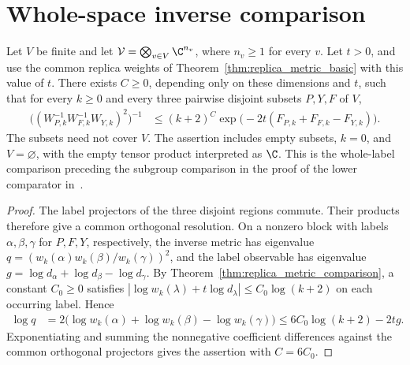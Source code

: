 \section{Whole-space inverse comparison}


\begin{theorem}
    \label{thm:replica_whole_inverse}
    \leanok
    Let $V$ be finite and let
    $\mathcal V=\bigotimes_{v\in V}\C^{n_v}$, where $n_v\ge1$ for every $v$.
    Let $t>0$, and use the common replica weights of
    Theorem~\ref{thm:replica_metric_basic} with this value of $t$.
    There exists $C\ge0$, depending only on these dimensions and $t$, such that
    for every $k\ge0$ and every three pairwise disjoint subsets $P,Y,F$ of $V$,
    \begin{align}
        \bigl((W_{P,k}^{-1}W_{F,k}^{-1}W_{Y,k})^2\bigr)^{-1}
         & \le (k+2)^C
        \exp\bigl(-2t(F_{P,k}+F_{F,k}-F_{Y,k})\bigr).
    \end{align}
    The subsets need not cover $V$. The assertion includes empty subsets,
    $k=0$, and $V=\varnothing$, with the empty tensor product interpreted as $\C$.
    This is the whole-label comparison preceding the subgroup comparison
    in the proof of the lower comparator in~\cite[Section~7]{OpenAI2026AreaLaw}.
\end{theorem}

\begin{proof}\leanok
    The label projectors of the three disjoint regions commute. Their products
    therefore give a common orthogonal resolution. On a nonzero block with
    labels $\alpha,\beta,\gamma$ for $P,F,Y$, respectively, the inverse metric
    has eigenvalue $q=(w_k(\alpha)w_k(\beta)/w_k(\gamma))^2$, and the label
    observable has eigenvalue
    $g=\log d_\alpha+\log d_\beta-\log d_\gamma$.
    By Theorem~\ref{thm:replica_metric_comparison}, a constant $C_0\ge0$
    satisfies $|\log w_k(\lambda)+t\log d_\lambda|\le C_0\log(k+2)$
    on each occurring label. Hence
    \begin{align}
        \log q
         & =2\bigl(\log w_k(\alpha)+\log w_k(\beta)-\log w_k(\gamma)\bigr)
        \le 6C_0\log(k+2)-2tg.
    \end{align}
    Exponentiating and summing the nonnegative coefficient differences against
    the common orthogonal projectors gives the assertion with $C=6C_0$.
\end{proof}
